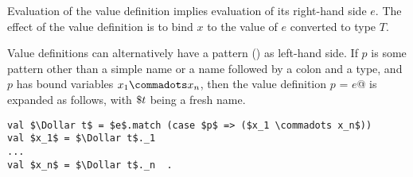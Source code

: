 \documentclass[11pt]{report}
\begin{document}
Evaluation of the value definition implies evaluation of its
right-hand side $e$.  The effect of the value definition is to bind
$x$ to the value of $e$ converted to type $T$.

Value definitions can alternatively have a pattern
() as left-hand side.  If $p$ is some pattern other
than a simple name or a name followed by a colon and a type, and $p$
has bound variables $x_1 \commadots x_n$, then the value definition
\verb@val $p$ = $e$@ is expanded as follows, with $\$ t$ being a
fresh name.
\begin{verbatim}
val $\Dollar t$ = $e$.match (case $p$ => ($x_1 \commadots x_n$))
val $x_1$ = $\Dollar t$._1
...
val $x_n$ = $\Dollar t$._n  .
\end{verbatim}

%
%



\end{document}
